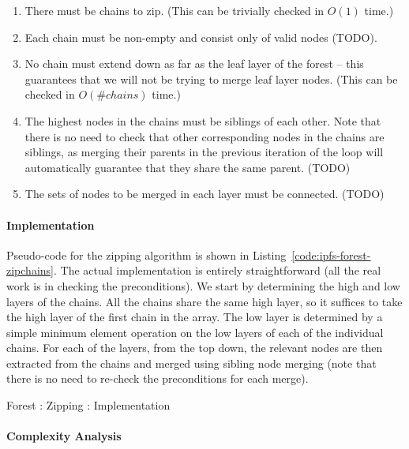 \begin{enumerate}

\item There must be chains to zip. (This can be trivially checked in $O(1)$ time.)
\item Each chain must be non-empty and consist only of valid nodes (TODO).
\item No chain must extend down as far as the leaf layer of the forest -- this guarantees that we will not be trying to merge leaf layer nodes. (This can be checked in $O(\#\mathit{chains})$ time.)
\item The highest nodes in the chains must be siblings of each other. Note that there is no need to check that other corresponding nodes in the chains are siblings, as merging their parents in the previous iteration of the loop will automatically guarantee that they share the same parent. (TODO)
\item The sets of nodes to be merged in each layer must be connected. (TODO)

\end{enumerate}

\paragraph{Implementation}

Pseudo-code for the zipping algorithm is shown in Listing~\ref{code:ipfs-forest-zipchains}. The actual implementation is entirely straightforward (all the real work is in checking the preconditions). We start by determining the high and low layers of the chains. All the chains share the same high layer, so it suffices to take the high layer of the first chain in the array. The low layer is determined by a simple minimum element operation on the low layers of each of the individual chains. For each of the layers, from the top down, the relevant nodes are then extracted from the chains and merged using sibling node merging (note that there is no need to re-check the preconditions for each merge).

\begin{stulisting}[p]
\caption{Forest : Zipping : Implementation}
\label{code:ipfs-forest-zipchains}

\end{stulisting}

\paragraph{Complexity Analysis}

